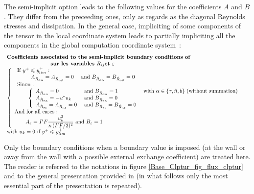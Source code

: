 The semi-implicit option leads to the following values for the 
coefficients $A$ and $B$. They differ from the preceeding ones, only 
as regards as the diagonal Reynolds stresses and dissipation. 
In the general case, impliciting of some components of the tensor 
in the local coordinate system leads to partially impliciting 
all the components in the global computation coordinate system~:
\begin{equation}
\begin{array}{l}
\text{\bf Coefficients associated to the semi-implicit boundary conditions of}\\
\qquad\qquad\qquad\qquad\text {\bf sur les variables } R_{ij} \text{\bf et } \varepsilon \\
\left\{\begin{array}{l}
\begin{array}{l}
\text{If }y^+\leqslant y^+_{lim}\text{~:}\\
\qquad\begin{array}{lll}
      A_{\hat R_{\alpha\alpha}} = A_{\hat R_{\alpha\beta}} = 0  &\text{ and } B_{\hat R_{\alpha\alpha}} =B_{\hat R_{\alpha\beta}}= 0 &
      \end{array}\\
\text{Sinon~:}\\
\qquad\left\{\begin{array}{lll}
      A_{\hat R_{\alpha\alpha}} = 0  &\text{ and } B_{\hat R_{\alpha\alpha}} = 1 &\text{ with }\alpha \in \{\tau,\tilde{n},b\}\text{ (without summation)}\\
      A_{\hat R_{\tau \tilde{n}}} = -u^*u_k   &\text{ and } B_{\hat R_{\tau \tilde{n}}} = 0 &\\
      A_{\hat R_{\tau  b}} = A_{\hat R_{\tilde{n} b}} = 0   &\text{ and } B_{\hat R_{\tau b}} =B_{\hat R_{\tilde{n} b}} = 0 &\\
      \end{array}\right.
\end{array}\\
\text{And for all cases~:}\\
\qquad A_\varepsilon=I'F\displaystyle\frac{ u_k^3}{\kappa\, (I'F/2)^2}\text{ and } B_\varepsilon= 1
\end{array}\right.\\
\text{with } u_k = 0 \text { if } y^+\leqslant y^+_{lim}
\end{array}
\end{equation}




\newpage
{}
Only the boundary conditions when a boundary value is imposed 
(at the wall or away from the wall with a possible external exchange coefficient)
are treated here.
The reader is referred to the notations in figure
\ref{Base_Clptur_fig_flux_clptur} and to the general presentation provided in  
 (in what follows only the most essential part of the 
presentation is repeated).

